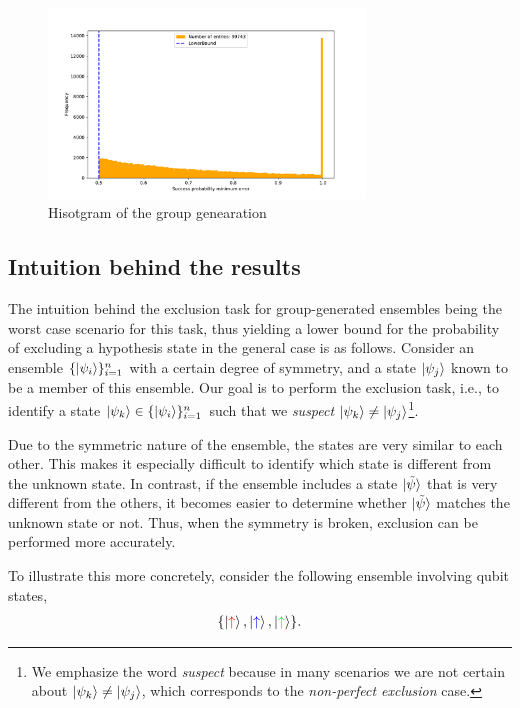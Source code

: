 \documentclass[12pt,letterpaper]{article}
\begin{document}
\begin{figure}[H]
	\centering
	\includegraphics[width=0.75\textwidth, trim={1.0cm 0.3cm 2.4cm 1.5cm}, clip]{../Plots/ExclusionZeroErrorRandomDistributionZ3Prob0.5.pdf}
	\caption{Hisotgram of the group genearation }
	\label{FigureDistZ5ZE0.5}
\end{figure}

\subsection{Intuition behind the results}

The intuition behind the exclusion task for group-generated ensembles being the worst case scenario for this task, thus yielding a lower bound for the probability of excluding a hypothesis state in the general case is as follows. Consider an ensemble $\{\ket{\psi_i}\}_{i=1}^n$ with a certain degree of symmetry, and a state $\ket{\psi_j}$ known to be a member of this ensemble. Our goal is to perform the exclusion task, i.e., to identify a state $\ket{\psi_k} \in \{\ket{\psi_i}\}_{i=1}^n$ such that we \emph{suspect} $\ket{\psi_k} \neq \ket{\psi_j}$\footnote{We emphasize the word \emph{suspect} because in many scenarios we are not certain about $\ket{\psi_k} \neq \ket{\psi_j}$, which corresponds to the \emph{non-perfect exclusion} case.}.

Due to the symmetric nature of the ensemble, the states are very similar to each other. This makes it especially difficult to identify which state is different from the unknown state. In contrast, if the ensemble includes a state $\ket{\tilde{\psi}}$ that is very different from the others, it becomes easier to determine whether $\ket{\tilde{\psi}}$ matches the unknown state or not. Thus, when the symmetry is broken, exclusion can be performed more accurately.

To illustrate this more concretely, consider the following ensemble involving qubit states,
\begin{align}
\{\ket{\textcolor{red}{\uparrow}}, \ket{\textcolor{blue}{\uparrow}}, \ket{\textcolor{green}{\uparrow}}\}.
\end{align}
\end{document}
